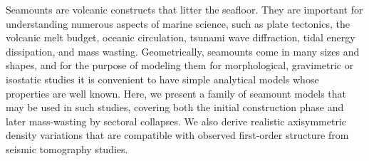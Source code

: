 Seamounts are volcanic constructs that litter the seafloor.
They are important for understanding numerous aspects of marine science, such as
plate tectonics, the volcanic melt budget, oceanic circulation, tsunami wave diffraction,
tidal energy dissipation, and mass wasting. Geometrically, seamounts come in many sizes and shapes,
and for the purpose of modeling them for morphological, gravimetric or isostatic studies
it is convenient to have simple analytical models whose properties are well known.  Here,
we present a family of seamount models that may be used in such studies, covering both the
initial construction phase and later mass-wasting by sectoral collapses. We also derive
realistic axisymmetric density variations that are compatible with observed first-order structure
from seismic tomography studies.
